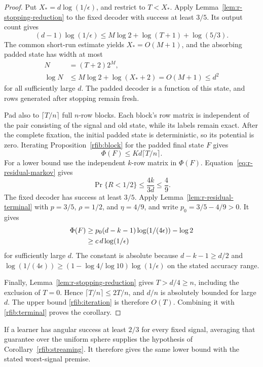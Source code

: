 \begin{proof}
Put \(X_*=d\log(1/\epsilon)\), and restrict to \(T<X_*\).
Apply Lemma~\ref{lem:r-stopping-reduction} to the fixed decoder with
success at least \(3/5\).  Its output count gives
\begin{equation}\label{rfib:output-count}
 (d-1)\log(1/\epsilon)
 \le M\log2+\log(T+1)+\log(5/3).
\end{equation}
The common short-run estimate yields \(X_*=O(M+1)\), and the
absorbing padded state has width at most
\begin{equation}\label{rfib:width}
 \begin{aligned}
 N&=(T+2)2^M,\\
 \log N&\le M\log2+\log(X_*+2)=O(M+1)\le d^2
 \end{aligned}
\end{equation}
for all sufficiently large \(d\).  The padded decoder is a function
of this state, and rows generated after stopping remain fresh.

Pad also to \(\lceil T/n\rceil\) full \(n\)-row blocks.  Each block's
row matrix is independent of the pair consisting of the signal and old
state, while its labels remain exact.  After the complete fixation, the
initial padded state is deterministic, so its potential is zero.  Iterating
Proposition~\ref{rfib:block} for the padded final state \(F\) gives
\begin{equation}\label{rfib:iteration}
 \Phi(F)\le Kd\lceil T/n\rceil.
\end{equation}
For a lower bound use the independent \(k\)-row matrix in
\(\Phi(F)\).  Equation~\eqref{eq:r-residual-markov} gives
\[
 \Pr\{R<1/2\}\le\frac{4k}{3d}\le\frac49.
\]
The fixed decoder has success at least \(3/5\).  Apply
Lemma~\ref{lem:r-residual-terminal} with \(p=3/5\),
\(\rho=1/2\), and \(\eta=4/9\), and write
\(p_0=3/5-4/9>0\).  It gives
\begin{align}
 \Phi(F)
 &\ge p_0(d-k-1)\log(1/(4\epsilon))-\log2 \notag\\
 &\ge c\,d\log(1/\epsilon)                              \label{rfib:terminal}
\end{align}
for sufficiently large \(d\).  The constant is absolute because
\(d-k-1\ge d/2\) and
\(\log(1/(4\epsilon))\ge
 (1-\log4/\log10)\log(1/\epsilon)\) on the stated accuracy range.

Finally, Lemma~\ref{lem:r-stopping-reduction} gives
\(T>d/4\ge n\), including the exclusion of \(T=0\).
Hence \(\lceil T/n\rceil\le2T/n\), and \(d/n\) is
absolutely bounded for large \(d\).  The upper bound
\eqref{rfib:iteration} is therefore \(O(T)\).  Combining it with
\eqref{rfib:terminal} proves the corollary.
\end{proof}

If a learner has angular success at least \(2/3\) for every fixed
signal, averaging that guarantee over the uniform sphere supplies the
hypothesis of Corollary~\ref{rfib:streaming}.  It therefore gives the
same lower bound with the stated worst-signal premise.

